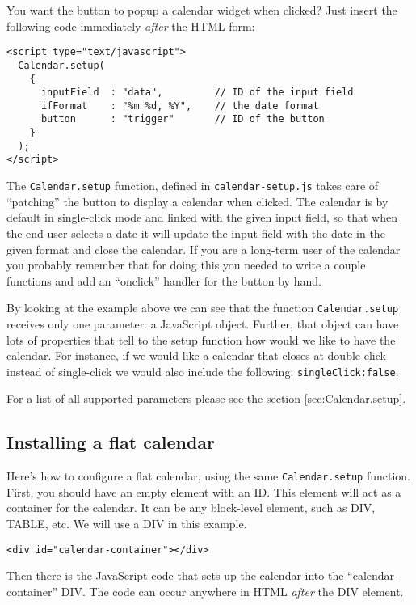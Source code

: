 \documentclass[a4paper,10pt]{article}
\begin{document}
\noindent You want the button to popup a calendar widget when clicked?  Just
insert the following code immediately \emph{after} the HTML form:

\begin{verbatim}
<script type="text/javascript">
  Calendar.setup(
    {
      inputField  : "data",         // ID of the input field
      ifFormat    : "%m %d, %Y",    // the date format
      button      : "trigger"       // ID of the button
    }
  );
</script>
\end{verbatim}

The \texttt{Calendar.setup} function, defined in \texttt{calendar-setup.js}
takes care of ``patching'' the button to display a calendar when clicked.  The
calendar is by default in single-click mode and linked with the given input
field, so that when the end-user selects a date it will update the input field
with the date in the given format and close the calendar.  If you are a
long-term user of the calendar you probably remember that for doing this you
needed to write a couple functions and add an ``onclick'' handler for the
button by hand.

By looking at the example above we can see that the function
\texttt{Calendar.setup} receives only one parameter: a JavaScript object.
Further, that object can have lots of properties that tell to the setup
function how would we like to have the calendar.  For instance, if we would
like a calendar that closes at double-click instead of single-click we would
also include the following: \texttt{singleClick:false}.

For a list of all supported parameters please see the section
\ref{sec:Calendar.setup}.

\subsection{Installing a flat calendar}\label{sec:quick-start-flat}

Here's how to configure a flat calendar, using the same \texttt{Calendar.setup}
function.  First, you should have an empty element with an ID.  This element
will act as a container for the calendar.  It can be any block-level element,
such as DIV, TABLE, etc.  We will use a DIV in this example.

\begin{verbatim}
<div id="calendar-container"></div>
\end{verbatim}

Then there is the JavaScript code that sets up the calendar into the
``calendar-container'' DIV.  The code can occur anywhere in HTML
\emph{after} the DIV element.
\end{document}
